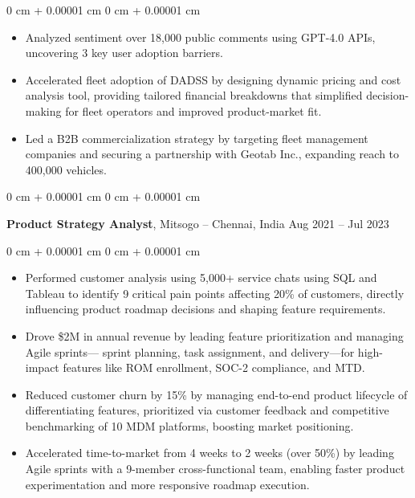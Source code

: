 \documentclass[10pt, letterpaper]{article}
\newenvironment{highlights}{
    \begin{itemize}[
        topsep=0.10 cm,
        parsep=0.10 cm,
        partopsep=0pt,
        itemsep=0pt,
        leftmargin=0 cm + 10pt
    ]
}{
    \end{itemize}
} %
\newenvironment{onecolentry}{
    \begin{adjustwidth}{
        0 cm + 0.00001 cm
    }{
        0 cm + 0.00001 cm
    }
}{
    \end{adjustwidth}
} %
\newenvironment{twocolentry}[2][]{
    \onecolentry
    \def\secondColumn{#2}
    \setcolumnwidth{\fill, 4.5 cm}
    \begin{paracol}{2}
}{
    \switchcolumn \raggedleft \secondColumn
    \end{paracol}
    \endonecolentry
} %
\begin{document}
        \vspace{0.10 cm}
        \begin{onecolentry}
            \begin{highlights}
                \item Analyzed sentiment over 18,000 public comments using GPT-4.0 APIs, uncovering 3 key user adoption barriers.
                \item Accelerated fleet adoption of DADSS by designing dynamic pricing and cost analysis tool, providing tailored financial breakdowns that simplified decision-making for fleet operators and improved product-market fit.
                \item Led a B2B commercialization strategy by targeting fleet management companies and securing a partnership with Geotab Inc., expanding reach to 400,000 vehicles.
                

            \end{highlights}
        \end{onecolentry}
        \vspace{0.2 cm}

        \begin{twocolentry}{
            Aug 2021 – Jul 2023
        }
            \textbf{Product Strategy Analyst}, Mitsogo -- Chennai, India\end{twocolentry}

        \vspace{0.10 cm}
        \begin{onecolentry}
            \begin{highlights}
                \item Performed customer analysis using 5,000+ service chats using SQL and Tableau to identify 9 critical pain points affecting 20\% of customers, directly influencing product roadmap decisions and shaping feature requirements.

                \item Drove \$2M in annual revenue by leading feature prioritization and managing Agile sprints— sprint planning, task assignment, and delivery—for high-impact features like ROM enrollment, SOC-2 compliance, and MTD.

                \item Reduced customer churn by 15\% by managing end-to-end product lifecycle of differentiating features, prioritized via customer feedback and competitive benchmarking of 10 MDM platforms, boosting market positioning.

                \item Accelerated time-to-market from 4 weeks to 2 weeks (over 50\%) by leading Agile sprints with a 9-member cross-functional team, enabling faster product experimentation and more responsive roadmap execution.

            \end{highlights}
        \end{onecolentry}
\end{document}
